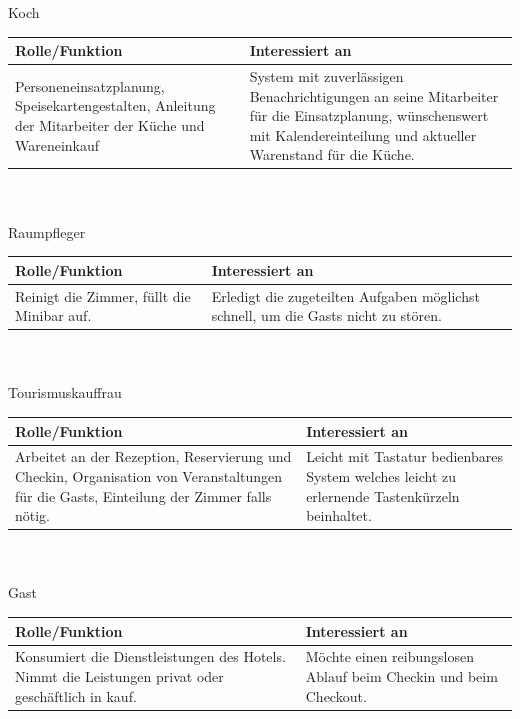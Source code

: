 \documentclass[10pt,a4paper,titlepage]{article}
\begin{document}
\newpage
\noindent Koch\\
\begin{tabular}[t]{|p{5cm}|p{5cm}|}
    \hline
    \textbf{Rolle\slash{}Funktion} & \textbf{Interessiert an} \\
    \hline
Personeneinsatzplanung, Speisekartengestalten, Anleitung der \Gls{Mitarbeiter} der Küche und Wareneinkauf &
	System mit zuverlässigen Benachrichtigungen an seine \Gls{Mitarbeiter} für die Einsatzplanung, wünschenswert mit Kalendereinteilung und aktueller Warenstand für die Küche. \\
    \hline
\end{tabular}
\\ 
\\ 
Raumpfleger \\
\begin{tabular}[t]{|p{5cm}|p{5cm}|}
    \hline
    \textbf{Rolle\slash{}Funktion} & \textbf{Interessiert an} \\
    \hline
Reinigt die Zimmer, füllt die Minibar auf. &
	Erledigt die zugeteilten Aufgaben möglichst schnell, um die \Glspl{Gast} nicht zu stören. \\
    \hline
\end{tabular}
\\ 
\\ 
Tourismuskauffrau \\
\begin{tabular}[t]{|p{5cm}|p{5cm}|}
    \hline
    \textbf{Rolle\slash{}Funktion} & \textbf{Interessiert an} \\
    \hline
Arbeitet an der \Gls{Rezeption}, \Gls{Reservierung} und \Gls{Checkin}, Organisation von Veranstaltungen für die \Glspl{Gast}, Einteilung der \Gls{Zimmer} falls nötig. &
	Leicht mit Tastatur bedienbares System welches leicht zu erlernende Tastenkürzeln beinhaltet. \\
    \hline
\end{tabular}
\\ 
\\ 
\Gls{Gast}\\
\begin{tabular}[t]{|p{5cm}|p{5cm}|}
    \hline
    \textbf{Rolle\slash{}Funktion} & \textbf{Interessiert an} \\
    \hline
	Konsumiert die Dienstleistungen des Hotels. Nimmt die Leistungen privat oder geschäftlich in kauf. &
	Möchte einen reibungslosen Ablauf beim \Gls{Checkin} und beim \Gls{Checkout}. \\
    \hline
\end{tabular}
\end{document}
